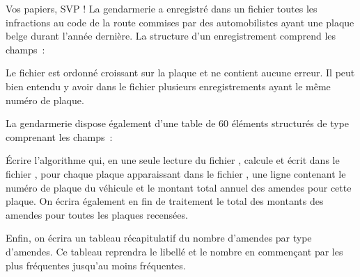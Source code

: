 \begin{Exercice}{Vos papiers, SVP !}
	La gendarmerie a enregistré dans un fichier  toutes les infractions au
	code de la route commises par des automobilistes ayant une plaque belge
	durant l’année dernière. La structure  d’un
	enregistrement comprend les champs~:


	Le fichier est ordonné croissant sur la plaque et ne contient aucune
	erreur. Il peut bien entendu y avoir dans le fichier plusieurs
	enregistrements ayant le même numéro de plaque.

	La gendarmerie dispose également d’une table 
	de 60 éléments structurés de type  comprenant les champs~:


	Écrire l’algorithme qui, en une seule lecture du fichier , calcule et
	écrit dans le fichier , pour chaque plaque apparaissant dans le
	fichier , une ligne contenant le numéro de plaque du véhicule et le
	montant total annuel des amendes pour cette plaque. On écrira également
	en fin de traitement le total des montants des amendes pour toutes les
	plaques recensées.

	Enfin, on écrira un tableau récapitulatif du nombre d’amendes par type
	d’amendes. Ce tableau reprendra le libellé et le nombre en commençant
	par les plus fréquentes jusqu’au moins fréquentes. 
\end{Exercice}

